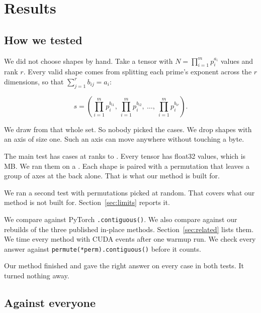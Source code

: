 \section{Results}
\label{sec:eval}

\subsection{How we tested}
\label{sec:setup}

We did not choose shapes by hand. Take a tensor with
$N = \prod_{i=1}^{m} p_i^{a_i}$ values and rank $r$. Every valid shape comes
from splitting each prime's exponent across the $r$ dimensions, so that
$\sum_{j=1}^{r} b_{ij} = a_i$:

\begin{equation}
s = \left( \prod_{i=1}^{m} p_i^{b_{i1}},\ \prod_{i=1}^{m} p_i^{b_{i2}},\
           \ldots,\ \prod_{i=1}^{m} p_i^{b_{ir}} \right).
\label{eq:shapes}
\end{equation}

We draw from that whole set. So nobody picked the cases. We drop shapes with an
axis of size one. Such an axis can move anywhere without touching a byte.

The main test has \resCases{} cases at ranks \resRankLo{} to \resRankHi{}.
Every tensor has \resElements{} float32 values, which is \resTensorMB{}\,MB. We
ran them on a \resDevice{}. Each shape is paired with a permutation that leaves
a group of axes at the back alone. That is what our method is built for.

We ran a second test with \hardCases{} permutations picked at random. That
covers what our method is not built for. Section~\ref{sec:limits} reports it.

We compare against PyTorch \texttt{.contiguous()}. We also compare against our
rebuilds of the three published in-place methods.
Section~\ref{sec:related} lists them. We time every method with CUDA events
after one warmup run. We check every answer against
\texttt{permute(*perm).contiguous()} before it counts.

Our method finished and gave the right answer on every case in both tests. It
turned nothing away.



\subsection{Against everyone}

